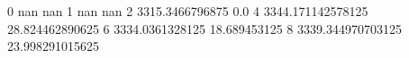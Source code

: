 0 nan nan
1 nan nan
2 3315.3466796875 0.0
4 3344.171142578125 28.824462890625
6 3334.0361328125 18.689453125
8 3339.344970703125 23.998291015625
